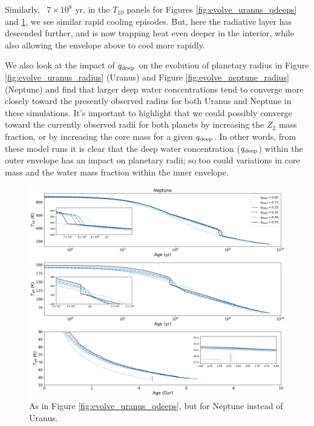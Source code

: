 \documentclass[11pt]{ucscthesisbs}
\begin{document}
Similarly, ~$7 \times 10^8$ yr, in the $T_{10}$ panels for Figures \ref{fig:evolve_uranus_qdeeps} and \ref{fig:evolve_neptune_qdeeps}, we see similar rapid cooling episodes. But, here the radiative layer has descended further, and is now trapping heat even deeper in the interior, while also allowing the envelope above to cool more rapidly.

We also look at the impact of $q_{\rm deep}$ on the evolution of planetary radius in Figure \ref{fig:evolve_uranus_radius} (Uranus) and Figure \ref{fig:evolve_neptune_radius} (Neptune) and find that larger deep water concentrations tend to converge more closely toward the presently observed radius for both Uranus and Neptune in these simulations. It's important to highlight that we could possibly converge toward the currently observed radii for both planets by increasing the $Z_{2}$ mass fraction, or by increasing the core mass for a given $q_{\rm deep}$. In other words, from these model runs it is clear that the deep water concentration ($q_{\rm deep}$) within the outer envelope has an impact on planetary radii; so too could variations in core mass and the water mass fraction within the inner envelope. 
\begin{figure}[h]
 \centerline{
  \includegraphics[width=\columnwidth]{figures/n_cooling_curves_nz_4096_more_qdeeps.png}
 }
\caption[Thermal Evolution Curves for Neptune - Water Vapor Concentration Comparisons]
{As in Figure \ref{fig:evolve_uranus_qdeeps}, but for Neptune instead of Uranus.}
\label{fig:evolve_neptune_qdeeps}
\end{figure}
\end{document}
